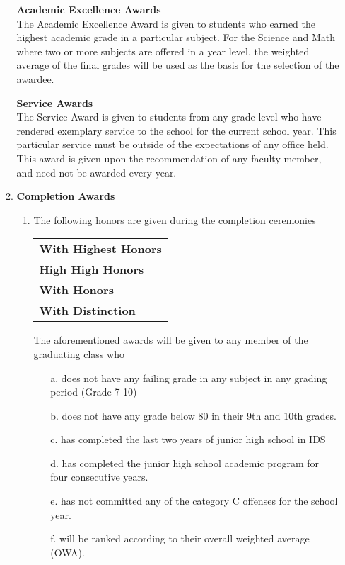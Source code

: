 \begin{enumerate}[label=(\Alph*)]
\begin{enumerate}[label=\Alph{enumi}.\arabic*]
		\textbf{Academic Excellence Awards} \\
		The Academic Excellence Award is given to students who earned the highest academic grade in a particular subject. For the Science and Math where two or more subjects are offered in a year level, the weighted average of the final grades will be used as the basis for the selection of the awardee. 
		
		\textbf{Service Awards} \\
		The Service Award is given to students from any grade level who have rendered exemplary service to the school for the current school year. This particular service must be outside of the expectations of any office held. This award is given upon the recommendation of any faculty member, and need not be awarded every year.
		
		\item \textbf{Completion Awards}
		
		\begin{enumerate}[label=\arabic*.]
			\item The following honors are given during the completion ceremonies
			\begin{center}
				\begin{tabular}{@{}l@{}}
					\textbf{With Highest Honors} \\
					\textbf{High High Honors}\\
					\textbf{With Honors}\\
					\textbf{With Distinction}
				\end{tabular}
			\end{center}
			
			The aforementioned awards will be given to any member of the graduating class who
			\begin{enumerate}[noitemsep]
				\item[a.] does not have any failing grade in any subject in any grading period
				(Grade 7-10) 
				\item[b.] does not have any grade below 80 in their 9th and 10th grades. 
				\item[c.] has completed the last two years of junior high school in IDS 
				\item[d.] has completed the junior high school academic program for four
				consecutive years. 
				\item[e.] has not committed any of the category C offenses for the school year.
				\item[f.] will be ranked according to their overall weighted average (OWA). \\
				

\end{enumerate}
\end{enumerate}
\end{enumerate}
\end{enumerate}
